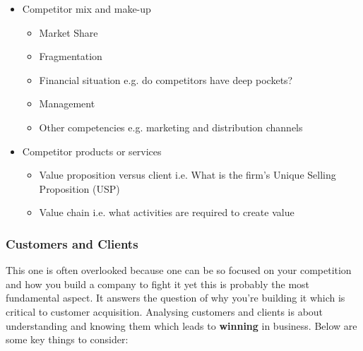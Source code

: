\documentclass[a4paper]{article}
\begin{document}
{\begin{itemize}
	\item Competitor mix and make-up
		\begin{itemize}
			\item Market Share
			\item Fragmentation
			\item Financial situation e.g. do competitors have deep pockets?
			\item Management
			\item Other competencies e.g. marketing and distribution channels
		\end{itemize}
	\item Competitor products or services
		\begin{itemize}
			\item Value proposition versus client i.e. What is the firm's Unique Selling Proposition (USP)
			\item Value chain i.e. what activities are required to create value
		\end{itemize}
\end{itemize}

\subsubsection{Customers and Clients}
This one is often overlooked because one can be so focused on your competition and how you build a company to fight it yet this is probably the most fundamental aspect. It answers the question of why you're building it which is critical to customer acquisition. Analysing customers and clients is about understanding and knowing them which leads to \textbf{winning} in business. Below are some key things to consider:

}
\end{document}
